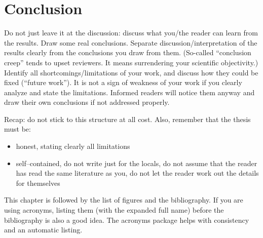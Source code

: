 \chapter{Conclusion}

Do not just leave it at the discussion: discuss what you/the reader can learn from the results. Draw some real conclusions. Separate discussion/interpretation of the results clearly from the conclusions you draw from them. (So-called ``conclusion creep'' tends to upset reviewers. It means surrendering your scientific objectivity.) Identify all shortcomings/limitations of your work, and discuss how they could be fixed (``future work''). It is not a sign of weakness of your work if you clearly analyze and state the limitations. Informed readers will notice them anyway and draw their own conclusions if not addressed properly.

\vspace{\baselineskip}
Recap: do not stick to this structure at all cost. Also, remember that the thesis must be:

\begin{itemize}
	\item honest, stating clearly all limitations
	\item self--contained, do not write just for the locals, do not assume that the reader has read the same literature as you, do not let the reader work out the details for themselves
\end{itemize}

This chapter is followed by the list of figures and the bibliography. If you are using acronyms, listing them (with the expanded full name) before the bibliography is also a good idea. The acronyms package helps with consistency and an automatic listing.
